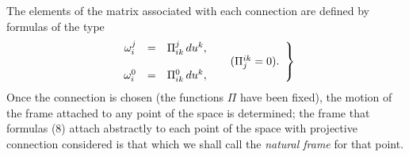 The elements of the matrix associated with each connection are defined by formulas of the type
\begin{eqnarray}
\left.
\begin{array}{rcl}
 \omega^j_i & =  &  \Pi^j_{ik}\, du^k, \\
  &   &  \hspace*{2cm} (\Pi^{ik}_j = 0 ). \\
 \omega^0_i & =  &  \Pi^0_{ik}\, du^k,
\end{array}
\right\}
\label{eq:1-8}
\end{eqnarray}
Once the connection is chosen (the functions $\Pi$ have been fixed),  the motion of the frame attached to any point of the space is determined; the frame that formulas (8) attach abstractly to each  point of the space with projective connection considered is that which  we shall call the {\em natural frame} for that point.































































































































